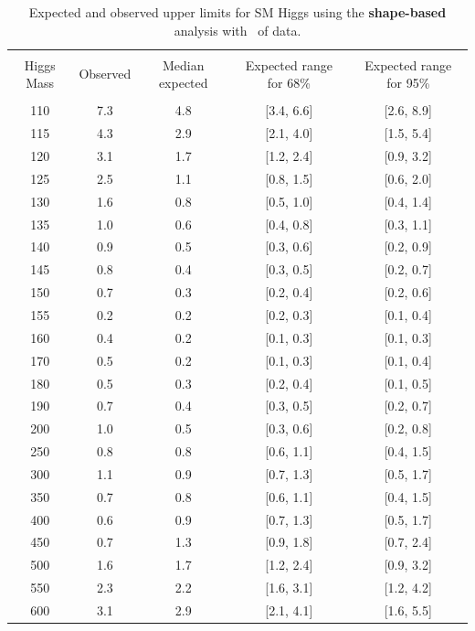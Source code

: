 \begin{table}[hbp!]
\begin{center}
\begin{tabular}{c c c c c}
\hline
\vspace{-3mm} && \\
 Higgs Mass & Observed  & Median expected & Expected range for 68\% & Expected range for 95\%   \\
\vspace{-3mm} && \\
\hline
110 & 7.3 & 4.8 & [3.4, 6.6] & [2.6, 8.9] \\
115 & 4.3 & 2.9 & [2.1, 4.0] & [1.5, 5.4] \\
120 & 3.1 & 1.7 & [1.2, 2.4] & [0.9, 3.2] \\
125 & 2.5 & 1.1 & [0.8, 1.5] & [0.6, 2.0] \\
130 & 1.6 & 0.8 & [0.5, 1.0] & [0.4, 1.4] \\
135 & 1.0 & 0.6 & [0.4, 0.8] & [0.3, 1.1] \\
140 & 0.9 & 0.5 & [0.3, 0.6] & [0.2, 0.9] \\
145 & 0.8 & 0.4 & [0.3, 0.5] & [0.2, 0.7] \\
150 & 0.7 & 0.3 & [0.2, 0.4] & [0.2, 0.6] \\
155 & 0.2 & 0.2 & [0.2, 0.3] & [0.1, 0.4] \\
160 & 0.4 & 0.2 & [0.1, 0.3] & [0.1, 0.3] \\
170 & 0.5 & 0.2 & [0.1, 0.3] & [0.1, 0.4] \\
180 & 0.5 & 0.3 & [0.2, 0.4] & [0.1, 0.5] \\
190 & 0.7 & 0.4 & [0.3, 0.5] & [0.2, 0.7] \\
200 & 1.0 & 0.5 & [0.3, 0.6] & [0.2, 0.8] \\
250 & 0.8 & 0.8 & [0.6, 1.1] & [0.4, 1.5] \\
300 & 1.1 & 0.9 & [0.7, 1.3] & [0.5, 1.7] \\
350 & 0.7 & 0.8 & [0.6, 1.1] & [0.4, 1.5] \\
400 & 0.6 & 0.9 & [0.7, 1.3] & [0.5, 1.7] \\
450 & 0.7 & 1.3 & [0.9, 1.8] & [0.7, 2.4] \\
500 & 1.6 & 1.7 & [1.2, 2.4] & [0.9, 3.2] \\
550 & 2.3 & 2.2 & [1.6, 3.1] & [1.2, 4.2] \\
600 & 3.1 & 2.9 & [2.1, 4.1] & [1.6, 5.5] \\
\hline
\end{tabular}
\caption{Expected and observed upper limits for SM Higgs using the
  {\bf shape-based} analysis with \intlumiEightTeV\ of data.}
\label{tab:mvabase_uls}
\end{center}
\end{table}
